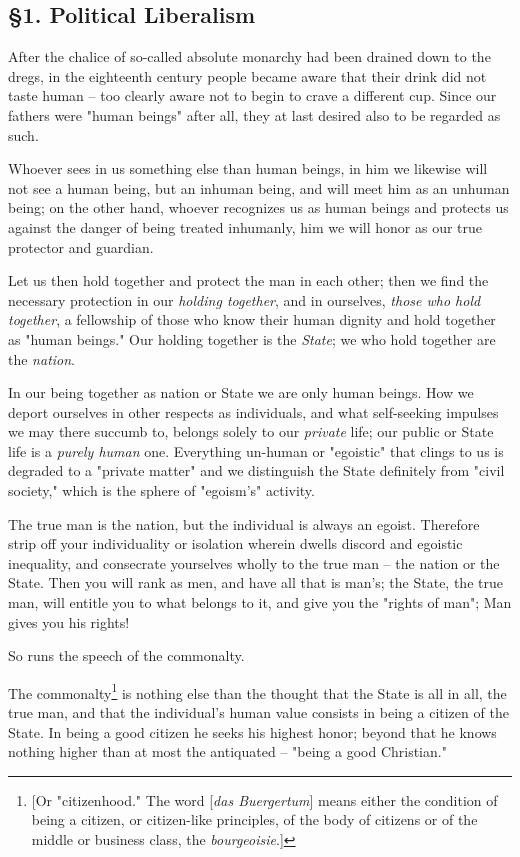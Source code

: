 \documentclass[a4paper]{book}
\begin{document}
\subsection[\S{}1. Political Liberalism]{\centering \S{}1. Political Liberalism}

After the chalice of so-called absolute monarchy had been drained down to the 
dregs, in the eighteenth century people became aware that their drink did not 
taste human -- too clearly aware not to begin to crave a different cup. Since 
our fathers were "{}human beings"{} after all, they at last desired also to be 
regarded as such.

Whoever sees in us something else than human beings, in him we likewise will 
not see a human being, but an inhuman being, and will meet him as an unhuman 
being; on the other hand, whoever recognizes us as human beings and protects 
us against the danger of being treated inhumanly, him we will honor as our 
true protector and guardian.

Let us then hold together and protect the man in each other; then we find the 
necessary protection in our \textit{holding together}, and in ourselves, 
\textit{those who hold together}, a fellowship of those who know their human 
dignity and hold together as "{}human beings."{} Our holding together is the 
\textit{State}; we who hold together are the \textit{nation}.

In our being together as nation or State we are only human beings. How we 
deport ourselves in other respects as individuals, and what self-seeking 
impulses we may there succumb to, belongs solely to our \textit{private} life; 
our public or State life is a \textit{purely human} one. Everything un-human 
or "{}egoistic"{} that clings to us is degraded to a "{}private matter"{} and 
we distinguish the State definitely from "{}civil society,"{} which is the 
sphere of "{}egoism's"{} activity.

The true man is the nation, but the individual is always an egoist. Therefore 
strip off your individuality or isolation wherein dwells discord and egoistic 
inequality, and consecrate yourselves wholly to the true man -- the nation or 
the State. Then you will rank as men, and have all that is man's; the State, 
the true man, will entitle you to what belongs to it, and give you the 
"{}rights of man"{}; Man gives you his rights!

So runs the speech of the commonalty.

The commonalty\footnote{[Or "{}citizenhood."{} The word [\textit{das 
Buergertum}] means either the condition of being a citizen, or citizen-like 
principles, of the body of citizens or of the middle or business class, the 
\textit{bourgeoisie}.]} is nothing else than the thought that the State is all 
in all, the true man, and that the individual's human value consists in being 
a citizen of the State. In being a good citizen he seeks his highest honor; 
beyond that he knows nothing higher than at most the antiquated -- "{}being a 
good Christian."{}
\end{document}

